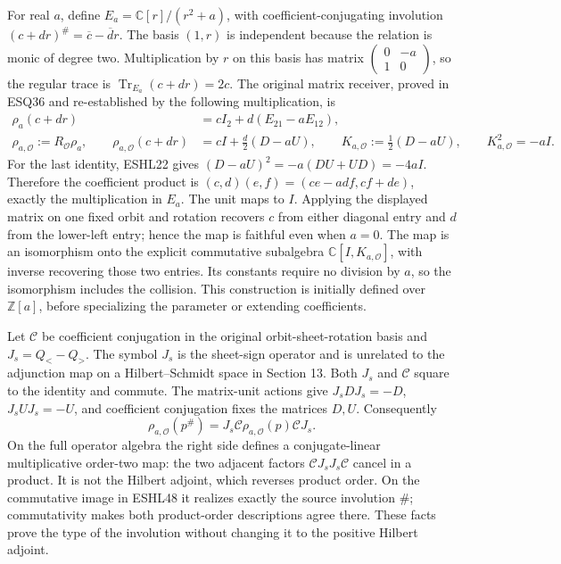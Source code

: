 \documentclass[
  10pt,
  a4paper,
]{article}
\begin{document}
For real \(a\), define \(E_a=\mathbb C[r]/(r^2+a)\), with
coefficient-conjugating involution
\((c+dr)^\#=\overline c-\overline d r\). The basis \((1,r)\) is
independent because the relation is monic of degree two. Multiplication
by \(r\) on this basis has matrix
\(\left(\begin{smallmatrix}0&-a\\1&0\end{smallmatrix}\right)\), so the
regular trace is \(\operatorname{Tr}_{E_a}(c+dr)=2c\). The original
matrix receiver, proved in ESQ36 and re-established by the following
multiplication, is \[
\begin{aligned}
\rho_a(c+dr)&=cI_2+d(E_{21}-aE_{12}),\\
\rho_{a,\mathcal O}:=R_{\mathcal O}\rho_a,\qquad
\rho_{a,\mathcal O}(c+dr)&=cI+\frac d2(D-aU),\qquad
K_{a,\mathcal O}:=\frac12(D-aU),\qquad
K_{a,\mathcal O}^2=-aI.
\end{aligned}
\tag{ESHL48}
\] For the last identity, ESHL22 gives \((D-aU)^2=-a(DU+UD)=-4aI\).
Therefore the coefficient product is \((c,d)(e,f)=(ce-adf,cf+de)\),
exactly the multiplication in \(E_a\). The unit maps to \(I\). Applying
the displayed matrix on one fixed orbit and rotation recovers \(c\) from
either diagonal entry and \(d\) from the lower-left entry; hence the map
is faithful even when \(a=0\). The map is an isomorphism onto the
explicit commutative subalgebra \(\mathbb C[I,K_{a,\mathcal O}]\), with
inverse recovering those two entries. Its constants require no division
by \(a\), so the isomorphism includes the collision. This construction
is initially defined over \(\mathbb Z[a]\), before specializing the
parameter or extending coefficients.

Let \(\mathcal C\) be coefficient conjugation in the original
orbit-sheet-rotation basis and \(J_s=Q_<-Q_>\). The symbol \(J_s\) is
the sheet-sign operator and is unrelated to the adjunction map on a
Hilbert--Schmidt space in Section 13. Both \(J_s\) and \(\mathcal C\)
square to the identity and commute. The matrix-unit actions give
\(J_sDJ_s=-D\), \(J_sUJ_s=-U\), and coefficient conjugation fixes the
matrices \(D,U\). Consequently \[
\rho_{a,\mathcal O}(p^\#)
=J_s\mathcal C\rho_{a,\mathcal O}(p)\mathcal C J_s.
\tag{ESHL49}
\] On the full operator algebra the right side defines a
conjugate-linear multiplicative order-two map: the two adjacent factors
\(\mathcal C J_sJ_s\mathcal C\) cancel in a product. It is not the
Hilbert adjoint, which reverses product order. On the commutative image
in ESHL48 it realizes exactly the source involution \(\#\);
commutativity makes both product-order descriptions agree there. These
facts prove the type of the involution without changing it to the
positive Hilbert adjoint.
\end{document}
